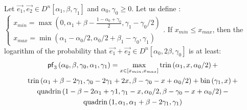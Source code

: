 \begin{lemma}
\label{lemma:better-filter}
Let $\vec{e_1}, \vec{e_2} \in D^n[\alpha_1, \beta, \gamma_1]$ and $\alpha_0, \gamma_0 \geq 0$. Let us define :
$\left\lbrace\begin{array}{l}
x_{min} = \max(0, \alpha_1+\beta - \frac{1-\alpha_0+\gamma_0}{2}, \gamma_1 - \gamma_0/2)\\
x_{max} = \min(\alpha_1-\alpha_0/2, \alpha_0/2 + \beta_1 - \gamma_0, \gamma_1)
\end{array}\right.$. If $x_{min} \leqslant x_{max}$, then the logarithm of the probability that $\vec{e_1} + \vec{e_2} \in D^n[\alpha_0, 2\beta, \gamma_0]$ is at least:
 \begin{multline*}
 \mathsf{pf}_3 \left(\alpha_0, \beta, \gamma_0, \alpha_1, \gamma_1 \right) = \max\limits_{x \in [x_{min}, x_{max}]} \mathrm{trin}\left(\alpha_1,x,\alpha_0/2\right) + \\ \mathrm{trin}\left(\alpha_1+\beta-2\gamma_1,\gamma_0-2\gamma_1+2x,\beta-\gamma_0-x+\alpha_0/2\right) + \mathrm{bin}\left(\gamma_1,x\right) + \\ \mathrm{quadrin}\left(1-\beta-2\alpha_1+\gamma1,\gamma_1-x,\alpha_0/2,\beta-\gamma_0-x+\alpha_0/2\right) -\\ \mathrm{quadrin}\left(1,\alpha_1,\alpha_1+\beta-2\gamma_1,\gamma_1\right)
 \end{multline*}
\end{lemma}
